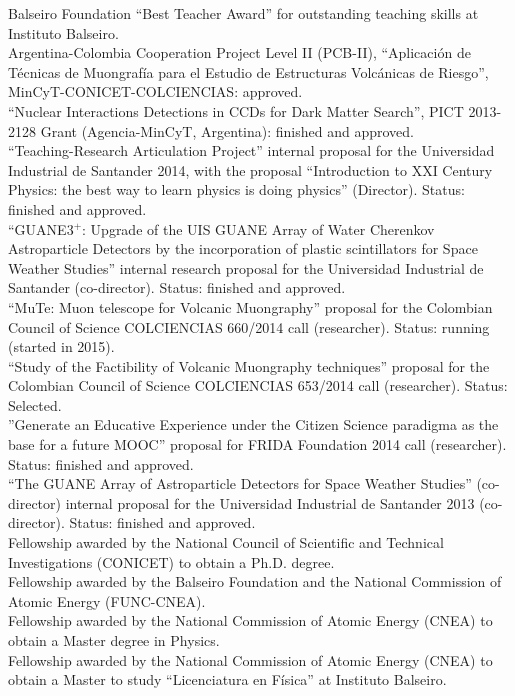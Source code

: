  Balseiro Foundation ``Best Teacher Award'' for outstanding teaching skills at Instituto Balseiro.\\
\ifres
\else
{} Argentina-Colombia Cooperation Project Level II (PCB-II), ``Aplicación de Técnicas de Muongrafía para el Estudio de Estructuras Volcánicas de Riesgo'', MinCyT-CONICET-COLCIENCIAS: approved.\\
 ``Nuclear Interactions Detections in CCDs for Dark Matter Search'', PICT 2013-2128 Grant (Agencia-MinCyT, Argentina): finished and approved.\\
 ``Teaching-Research Articulation Project'' internal proposal for the Universidad Industrial de Santander 2014, with the proposal ``Introduction to XXI Century Physics: the best way to learn physics is doing physics'' (Director). Status: finished and approved.\\
 ``GUANE3$^+$: Upgrade of the UIS GUANE Array of Water Cherenkov Astroparticle Detectors by the incorporation of plastic scintillators for Space Weather Studies'' internal research proposal for the Universidad Industrial de Santander (co-director). Status: finished and approved.\\
 ``MuTe: Muon telescope for Volcanic Muongraphy'' proposal for the Colombian Council of Science COLCIENCIAS 660/2014 call (researcher). Status: running (started in 2015).\\
 ``Study of the Factibility of Volcanic Muongraphy techniques'' proposal for the Colombian Council of Science COLCIENCIAS 653/2014 call (researcher). Status: Selected.\\
 ''Generate an Educative Experience under the Citizen Science paradigma as the base for a future MOOC'' proposal for FRIDA Foundation 2014 call (researcher). Status: finished and approved.\\ 
 ``The GUANE Array of Astroparticle Detectors for Space Weather Studies'' (co-director) internal proposal for the Universidad Industrial de Santander 2013 (co-director). Status: finished and approved.\\
Fellowship awarded by the National Council of Scientific and
Technical Investigations (CONICET) to obtain a Ph.D. degree.\\
Fellowship awarded by the Balseiro Foundation and the National
Commission of Atomic Energy (FUNC-CNEA).\\
Fellowship awarded by the National Commission of Atomic Energy
(CNEA) to obtain a Master degree in Physics.\\
Fellowship awarded by the National Commission of Atomic
Energy (CNEA) to obtain a Master to study ``Licenciatura en Física'' at
Instituto Balseiro.
\fi
\else
